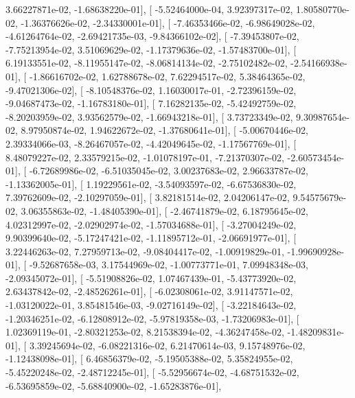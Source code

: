 \documentclass{article}
\begin{document}
          3.66227871e-02,  -1.68638220e-01],
       [ -5.52464000e-04,   3.92397317e-02,   1.80580770e-02,
         -1.36376626e-02,  -2.34330001e-01],
       [ -7.46353466e-02,  -6.98649028e-02,  -4.61264764e-02,
         -2.69421735e-03,  -9.84366102e-02],
       [ -7.39453807e-02,  -7.75213954e-02,   3.51069629e-02,
         -1.17379636e-02,  -1.57483700e-01],
       [  6.19133551e-02,  -8.11955147e-02,  -8.06814134e-02,
         -2.75102482e-02,  -2.54166938e-01],
       [ -1.86616702e-02,   1.62788678e-02,   7.62294517e-02,
          5.38464365e-02,  -9.47021306e-02],
       [ -8.10548376e-02,   1.16030017e-01,  -2.72396159e-02,
         -9.04687473e-02,  -1.16783180e-01],
       [  7.16282135e-02,  -5.42492759e-02,  -8.20203959e-02,
          3.93562579e-02,  -1.66943218e-01],
       [  3.73723349e-02,   9.30987654e-02,   8.97950874e-02,
          1.94622672e-02,  -1.37680641e-01],
       [ -5.00670446e-02,   2.39334066e-03,  -8.26467057e-02,
         -4.42049645e-02,  -1.17567769e-01],
       [  8.48079227e-02,   2.33579215e-02,  -1.01078197e-01,
         -7.21370307e-02,  -2.60573454e-01],
       [ -6.72689986e-02,  -6.51035045e-02,   3.00237683e-02,
          2.96633787e-02,  -1.13362005e-01],
       [  1.19229561e-02,  -3.54093597e-02,  -6.67536830e-02,
          7.39762609e-02,  -2.10297059e-01],
       [  3.82181514e-02,   2.04206147e-02,   9.54575679e-02,
          3.06355863e-02,  -1.48405390e-01],
       [ -2.46741879e-02,   6.18795645e-02,   4.02312997e-02,
         -2.02902974e-02,  -1.57034688e-01],
       [ -3.27004249e-02,   9.90399640e-02,  -5.17247421e-02,
         -1.11895712e-01,  -2.06691977e-01],
       [  3.22446263e-02,   7.27959713e-02,  -9.08404417e-02,
         -1.00919829e-01,  -1.99690928e-01],
       [ -9.52687658e-03,   3.17544969e-02,  -1.00773771e-01,
          7.09948348e-03,  -2.09345072e-01],
       [ -5.51908826e-02,   1.07467439e-01,  -5.43773920e-02,
          2.63437842e-02,  -2.48526261e-01],
       [ -6.02308061e-02,   3.91147571e-02,  -1.03120022e-01,
          3.85481546e-03,  -9.02716149e-02],
       [ -3.22184643e-02,  -1.20346251e-02,  -6.12808912e-02,
         -5.97819358e-03,  -1.73206983e-01],
       [  1.02369119e-01,  -2.80321253e-02,   8.21538394e-02,
         -4.36247458e-02,  -1.48209831e-01],
       [  3.39245694e-02,  -6.08221316e-02,   6.21470614e-03,
          9.15748976e-02,  -1.12438098e-01],
       [  6.46856379e-02,  -5.19505388e-02,   5.35824955e-02,
         -5.45220248e-02,  -2.48712245e-01],
       [ -5.52956674e-02,  -4.68751532e-02,  -6.53695859e-02,
         -5.68840900e-02,  -1.65283876e-01],
\end{document}
